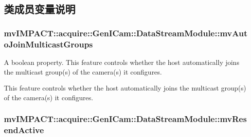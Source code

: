 \subsection{类成员变量说明}
\hypertarget{classmv_i_m_p_a_c_t_1_1acquire_1_1_gen_i_cam_1_1_data_stream_module_a87ac66bf873cec84754bd58c6d938408}{
\subsubsection[{mv\+Auto\+Join\+Multicast\+Groups}]{ mv\+I\+M\+P\+A\+C\+T\+::acquire\+::\+Gen\+I\+Cam\+::\+Data\+Stream\+Module\+::mv\+Auto\+Join\+Multicast\+Groups}}\label{classmv_i_m_p_a_c_t_1_1acquire_1_1_gen_i_cam_1_1_data_stream_module_a87ac66bf873cec84754bd58c6d938408}


A boolean property. This feature controls whether the host automatically joins the multicast group(s) of the camera(s) it configures. 

This feature controls whether the host automatically joins the multicast group(s) of the camera(s) it configures. \hypertarget{classmv_i_m_p_a_c_t_1_1acquire_1_1_gen_i_cam_1_1_data_stream_module_a201b0d1ea5837dc3554c269d91f1b431}{
\subsubsection[{mv\+Resend\+Active}]{ mv\+I\+M\+P\+A\+C\+T\+::acquire\+::\+Gen\+I\+Cam\+::\+Data\+Stream\+Module\+::mv\+Resend\+Active}}\label{classmv_i_m_p_a_c_t_1_1acquire_1_1_gen_i_cam_1_1_data_stream_module_a201b0d1ea5837dc3554c269d91f1b431}


